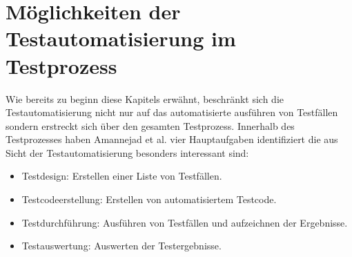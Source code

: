 \section{Möglichkeiten der Testautomatisierung im Testprozess}
\label{sec:bereiche_der_testautomatisierung}
Wie bereits zu beginn diese Kapitels erwähnt, beschränkt sich die Testautomatisierung nicht nur auf das automatisierte ausführen von Testfällen sondern erstreckt sich über den gesamten Testprozess. Innerhalb des Testprozesses haben Amannejad et al. \cite{amannejad_search-based_2014} vier Hauptaufgaben identifiziert die aus Sicht der Testautomatisierung besonders interessant sind:

\begin{itemize}
\item Testdesign: Erstellen einer Liste von Testfällen.
\item Testcodeerstellung: Erstellen von automatisiertem Testcode.
\item Testdurchführung: Ausführen von Testfällen und aufzeichnen der Ergebnisse.
\item Testauswertung: Auswerten der Testergebnisse.
\end{itemize}

